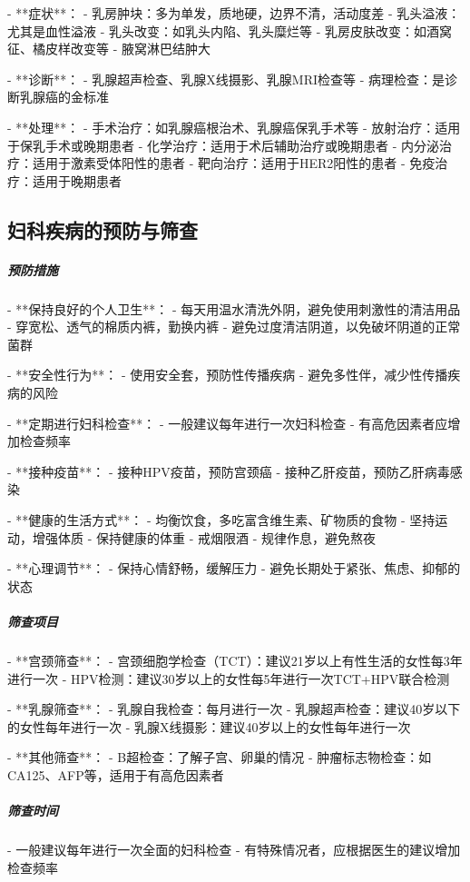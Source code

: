 \begin{enumerate}
- **症状**：
  - 乳房肿块：多为单发，质地硬，边界不清，活动度差
  - 乳头溢液：尤其是血性溢液
  - 乳头改变：如乳头内陷、乳头糜烂等
  - 乳房皮肤改变：如酒窝征、橘皮样改变等
  - 腋窝淋巴结肿大

- **诊断**：
  - 乳腺超声检查、乳腺X线摄影、乳腺MRI检查等
  - 病理检查：是诊断乳腺癌的金标准

- **处理**：
  - 手术治疗：如乳腺癌根治术、乳腺癌保乳手术等
  - 放射治疗：适用于保乳手术或晚期患者
  - 化学治疗：适用于术后辅助治疗或晚期患者
  - 内分泌治疗：适用于激素受体阳性的患者
  - 靶向治疗：适用于HER2阳性的患者
  - 免疫治疗：适用于晚期患者

\subsection{妇科疾病的预防与筛查}

\subparagraph{预防措施}

- **保持良好的个人卫生**：
  - 每天用温水清洗外阴，避免使用刺激性的清洁用品
  - 穿宽松、透气的棉质内裤，勤换内裤
  - 避免过度清洁阴道，以免破坏阴道的正常菌群

- **安全性行为**：
  - 使用安全套，预防性传播疾病
  - 避免多性伴，减少性传播疾病的风险

- **定期进行妇科检查**：
  - 一般建议每年进行一次妇科检查
  - 有高危因素者应增加检查频率

- **接种疫苗**：
  - 接种HPV疫苗，预防宫颈癌
  - 接种乙肝疫苗，预防乙肝病毒感染

- **健康的生活方式**：
  - 均衡饮食，多吃富含维生素、矿物质的食物
  - 坚持运动，增强体质
  - 保持健康的体重
  - 戒烟限酒
  - 规律作息，避免熬夜

- **心理调节**：
  - 保持心情舒畅，缓解压力
  - 避免长期处于紧张、焦虑、抑郁的状态

\subparagraph{筛查项目}

- **宫颈筛查**：
  - 宫颈细胞学检查（TCT）：建议21岁以上有性生活的女性每3年进行一次
  - HPV检测：建议30岁以上的女性每5年进行一次TCT+HPV联合检测

- **乳腺筛查**：
  - 乳腺自我检查：每月进行一次
  - 乳腺超声检查：建议40岁以下的女性每年进行一次
  - 乳腺X线摄影：建议40岁以上的女性每年进行一次

- **其他筛查**：
  - B超检查：了解子宫、卵巢的情况
  - 肿瘤标志物检查：如CA125、AFP等，适用于有高危因素者

\subparagraph{筛查时间}

- 一般建议每年进行一次全面的妇科检查
- 有特殊情况者，应根据医生的建议增加检查频率


\end{enumerate}
